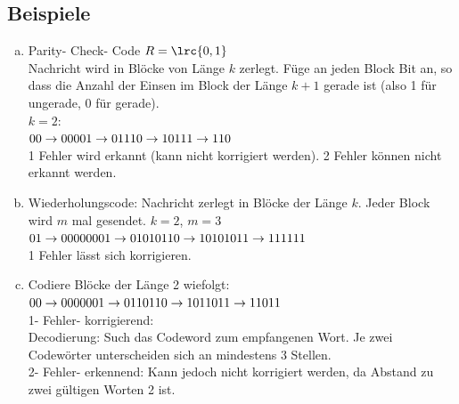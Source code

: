   \subsection{Beispiele}
    \begin{enumerate}[a)]
      \item Parity- Check- Code
        $R=\lrc{0,1}$\\
        Nachricht wird in Blöcke von Länge $k$ zerlegt. Füge an jeden Block Bit
        an, so dass die Anzahl der Einsen im Block der Länge $k+1$ gerade ist
        (also 1 für ungerade, 0 für gerade).\\
        $k=2$:\\
        $00\rightarrow000\\
        01\rightarrow011\\
        10\rightarrow101\\
        11\rightarrow110$\\
        1 Fehler wird erkannt (kann nicht korrigiert werden). 2 Fehler können
        nicht erkannt werden.
      \item Wiederholungscode: Nachricht zerlegt in Blöcke der Länge $k$. Jeder
        Block wird $m$ mal gesendet. $k=2$, $m=3$\\
        $01\rightarrow000000\\
        01\rightarrow010101\\
        10\rightarrow101010\\
        11\rightarrow111111$\\
        1 Fehler lässt sich korrigieren.
      \item Codiere Blöcke der Länge 2 wiefolgt:\\
        $00\rightarrow00000\\
        01\rightarrow01101\\
        10\rightarrow10110\\
        11\rightarrow11011$\\
        1- Fehler- korrigierend:\\
        Decodierung: Such das  Codeword zum empfangenen Wort. Je
        zwei\\Codewörter unterscheiden sich an mindestens 3 Stellen.\\
        2- Fehler- erkennend: Kann jedoch nicht korrigiert werden, da Abstand
        zu\\zwei gültigen Worten 2 ist.
    \end{enumerate}
